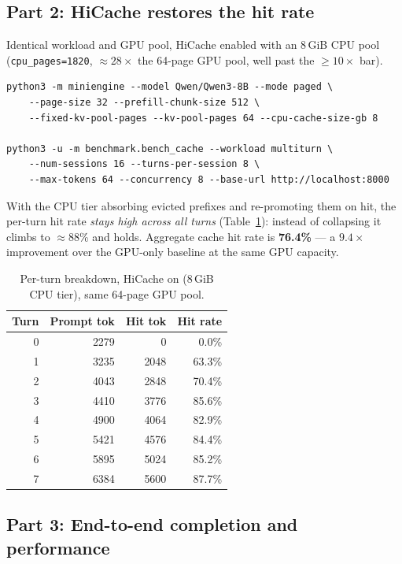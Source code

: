 \documentclass[11pt]{article}
\begin{document}
\subsection{Part 2: HiCache restores the hit rate}
\label{sec:restore}

Identical workload and GPU pool, HiCache enabled with an 8\,GiB CPU pool (\texttt{cpu\_pages=1820}, $\approx 28\times$ the 64-page GPU pool, well past the $\ge 10\times$ bar).

\begin{verbatim}
python3 -m miniengine --model Qwen/Qwen3-8B --mode paged \
    --page-size 32 --prefill-chunk-size 512 \
    --fixed-kv-pool-pages --kv-pool-pages 64 --cpu-cache-size-gb 8

python3 -u -m benchmark.bench_cache --workload multiturn \
    --num-sessions 16 --turns-per-session 8 \
    --max-tokens 64 --concurrency 8 --base-url http://localhost:8000
\end{verbatim}

\noindent With the CPU tier absorbing evicted prefixes and re-promoting them on hit, the per-turn hit rate \emph{stays high across all turns} (Table~\ref{tab:restore}): instead of collapsing it climbs to $\approx$88\% and holds. Aggregate cache hit rate is \textbf{76.4\%} --- a $9.4\times$ improvement over the GPU-only baseline at the same GPU capacity.

\begin{table}[htbp]
  \centering
  \caption{Per-turn breakdown, HiCache on (8\,GiB CPU tier), same 64-page GPU pool.}
  \label{tab:restore}
  \begin{tabular}{@{}rrrr@{}}
    \toprule
    Turn & Prompt tok & Hit tok & Hit rate \\
    \midrule
    0 & 2279 &    0 &  0.0\% \\
    1 & 3235 & 2048 & 63.3\% \\
    2 & 4043 & 2848 & 70.4\% \\
    3 & 4410 & 3776 & 85.6\% \\
    4 & 4900 & 4064 & 82.9\% \\
    5 & 5421 & 4576 & 84.4\% \\
    6 & 5895 & 5024 & 85.2\% \\
    7 & 6384 & 5600 & 87.7\% \\
    \bottomrule
  \end{tabular}
\end{table}

\subsection{Part 3: End-to-end completion and performance}
\end{document}
